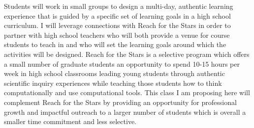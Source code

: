 \documentclass[aasms,11pt, longbibliography]{article}
\begin{document}
Students will work in small groups to design a multi-day, authentic learning experience that is guided by a specific set of learning goals in a high school curriculum.
I will leverage connections with Reach for the Stars in order to partner with high school teachers who will both provide a venue for course students to teach in and who will set the learning goals around which the activities will be designed.
Reach for the Stars is a selective program which offers a small number of graduate students an opportunity to spend 10-15 hours per week in high school classrooms leading young students through authentic scientific inquiry experiences while teaching those students how to think computationally and use computational tools.
This class I am proposing here will complement Reach for the Stars by providing an opportunity for professional growth and impactful outreach to a larger number of students which is overall a smaller time commitment and less selective.
\end{document}
